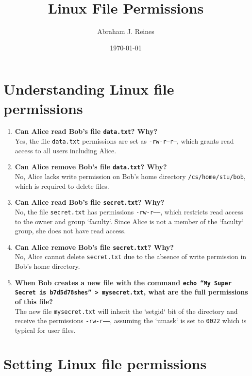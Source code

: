 \documentclass{article}
\title{Linux File Permissions}
\author{Abraham J. Reines}
\date{\today}
\begin{document}
\maketitle

\section*{Understanding Linux file permissions}

\begin{enumerate}
    \item \textbf{Can Alice read Bob's file \texttt{data.txt}? Why?}\\
    Yes, the file \texttt{data.txt} permissions are set as \texttt{-rw-r--r--}, which grants read access to all users including Alice.
    
    \item \textbf{Can Alice remove Bob's file \texttt{data.txt}? Why?}\\
    No, Alice lacks write permission on Bob's home directory \texttt{/cs/home/stu/bob}, which is required to delete files.
    
    \item \textbf{Can Alice read Bob's file \texttt{secret.txt}? Why?}\\
    No, the file \texttt{secret.txt} has permissions \texttt{-rw-r-----}, which restricts read access to the owner and group `faculty`. Since Alice is not a member of the `faculty` group, she does not have read access.
    
    \item \textbf{Can Alice remove Bob's file \texttt{secret.txt}? Why?}\\
    No, Alice cannot delete \texttt{secret.txt} due to the absence of write permission in Bob's home directory.
    
    \item \textbf{When Bob creates a new file with the command \texttt{echo “My Super Secret is b7d5d78shes” > mysecret.txt}, what are the full permissions of this file?}\\
    The new file \texttt{mysecret.txt} will inherit the `setgid` bit of the directory and receive the permissions \texttt{-rw-r-----}, assuming the `umask` is set to \texttt{0022} which is typical for user files.
\end{enumerate}

\section*{Setting Linux file permissions}
\end{document}
